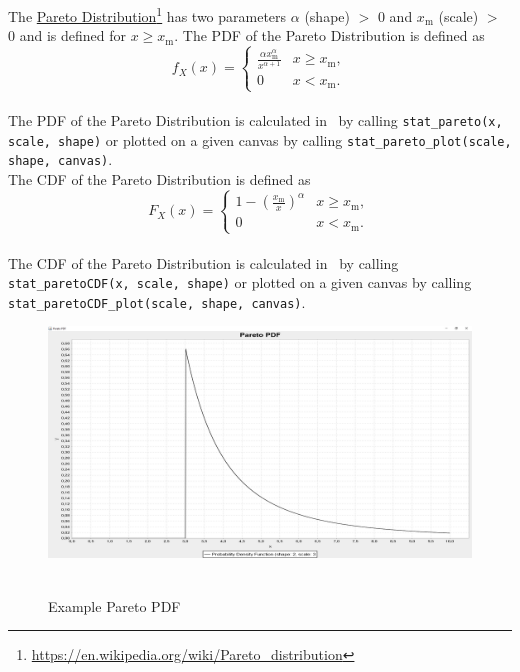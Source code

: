 		The \href{https://en.wikipedia.org/wiki/Pareto_distribution}{Pareto Distribution}\footnote{\url{https://en.wikipedia.org/wiki/Pareto_distribution}} has two parameters $\alpha$ (shape) $>$ 0 and $x_\mathrm{m}$ (scale) $>$ 0 and is defined for $x \geq x_\mathrm{m}$. The \ac{PDF} of the Pareto Distribution is defined as
		\\[0.3cm]
		$$f_X(x)= \begin{cases} \frac{\alpha x_\mathrm{m}^\alpha}{x^{\alpha+1}} & x \ge x_\mathrm{m}, \\ 0 & x < x_\mathrm{m}. \end{cases}$$
		\\[0.3cm]
		The \ac{PDF} of the Pareto Distribution is calculated in \setlx\ by calling \lstinline{stat_pareto(x, scale, shape)} or plotted on a given canvas by calling \lstinline{stat_pareto_plot(scale, shape, canvas)}.
		\\[0.3cm]
		The \ac{CDF} of the Pareto Distribution is defined as
		\\[0.3cm]
		$$F_X(x) = \begin{cases}1-\left(\frac{x_\mathrm{m}}{x}\right)^\alpha & x \ge x_\mathrm{m}, \\0 & x < x_\mathrm{m}.\end{cases}$$
		\\[0.3cm]
		The \ac{CDF} of the Pareto Distribution is calculated in \setlx\ by calling \lstinline{stat_paretoCDF(x, scale, shape)} or plotted on a given canvas by calling \lstinline{stat_paretoCDF_plot(scale, shape, canvas)}.

		\begin{figure}[H]
			\centering
			\includegraphics[width=1\textwidth]{Figures/implemented_functions/pareto_pdf}~\\
			\caption{Example Pareto PDF}
			\label{fig:pareto_pdf}
		\end{figure}


